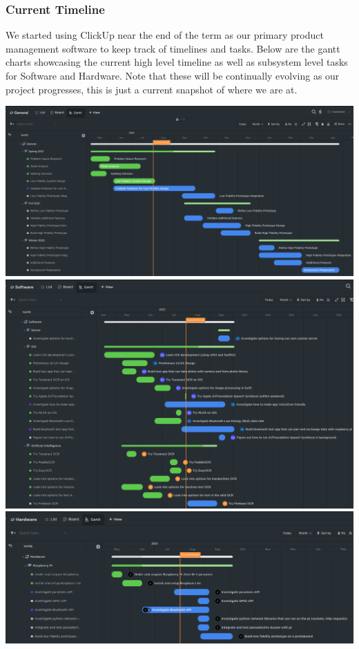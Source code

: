 \documentclass[a4paper,11pt]{article}
\begin{document}
\subsubsection{Current Timeline}
\label{current-timeline}

We started using ClickUp \cite{clickup} near the end of the term as our primary product management software to keep track of timelines and tasks. Below are the gantt charts showcasing the current high level timeline as well as subsystem level tasks for Software and Hardware. Note that these will be continually evolving as our project progresses, this is just a current snapshot of where we are at.
\begin{center}
    \includegraphics[width={1.0\linewidth}]{img/general-gantt.png}
    \includegraphics[width={1.0\linewidth}]{img/software-gantt.png}
    \includegraphics[width={1.0\linewidth}]{img/hardware-gantt.png}
\end{center}
\end{document}
